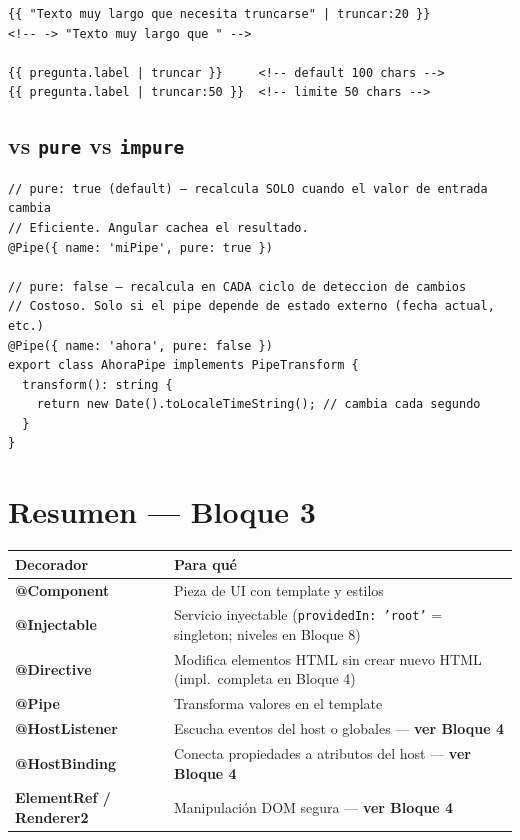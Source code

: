 \documentclass[12pt, a4paper]{article}
\begin{document}
\begin{lstlisting}
{{ "Texto muy largo que necesita truncarse" | truncar:20 }}
<!-- -> "Texto muy largo que " -->

{{ pregunta.label | truncar }}     <!-- default 100 chars -->
{{ pregunta.label | truncar:50 }}  <!-- limite 50 chars -->
\end{lstlisting}

\subsection{ vs  \texttt{pure} vs \texttt{impure}}

\begin{lstlisting}
// pure: true (default) — recalcula SOLO cuando el valor de entrada cambia
// Eficiente. Angular cachea el resultado.
@Pipe({ name: 'miPipe', pure: true })

// pure: false — recalcula en CADA ciclo de deteccion de cambios
// Costoso. Solo si el pipe depende de estado externo (fecha actual, etc.)
@Pipe({ name: 'ahora', pure: false })
export class AhoraPipe implements PipeTransform {
  transform(): string {
    return new Date().toLocaleTimeString(); // cambia cada segundo
  }
}
\end{lstlisting}

\section{  Resumen --- Bloque 3}

\begin{center}
\renewcommand{\arraystretch}{1.6}
\begin{tabular}{>{\ttfamily\bfseries}p{3.5cm} p{9cm}}
\toprule
Decorador & Para qué \\
\midrule
@Component & Pieza de UI con template y estilos \\
@Injectable & Servicio inyectable (\texttt{providedIn: 'root'} = singleton; niveles en Bloque 8) \\
@Directive & Modifica elementos HTML sin crear nuevo HTML (impl.\ completa en Bloque 4) \\
@Pipe & Transforma valores en el template \\
@HostListener & Escucha eventos del host o globales --- \textbf{ver Bloque 4} \\
@HostBinding & Conecta propiedades a atributos del host --- \textbf{ver Bloque 4} \\
ElementRef / Renderer2 & Manipulación DOM segura --- \textbf{ver Bloque 4} \\
\bottomrule
\end{tabular}
\end{center}
\end{document}
